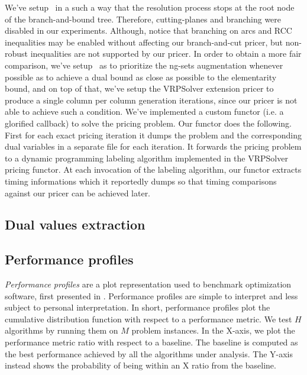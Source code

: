 \medskip

We've setup \bapcod\ in a such a way that the resolution process stops at the root
node of the branch-and-bound tree.
Therefore, cutting-planes and branching were disabled in our experiments.
Although, notice that branching on arcs and RCC inequalities may be
enabled without affecting our branch-and-cut pricer, but non-robust
inequalities are not supported by our pricer.
In order to obtain a more fair comparison, we've setup \bapcod\ as to prioritize
the ng-sets augmentation whenever possible as to achieve a dual bound as close
as possible to the elementarity bound, and on top of that,
we've setup the VRPSolver extension pricer to produce a single column
per column generation iterations, since our pricer is not able to achieve
such a condition.
We've implemented a custom functor (i.e. a glorified callback) to solve the pricing problem.
Our functor does the following.
First for each exact pricing iteration it dumps the problem and the corresponding dual variables
in a separate file for each iteration.
It forwards the pricing problem to a dynamic programming labeling algorithm
implemented in the VRPSolver pricing functor.
At each invocation of the labeling algorithm, our functor extracts timing informations
which it reportedly dumps so that timing comparisons against our pricer can be achieved later.

%
%
%

\subsection{Dual values extraction}


\subsection{Performance profiles}
\label{sec:results-performance-profiles}

\textit{Performance profiles} are a plot representation used to benchmark optimization software,
first presented in \textcite{dolan2002}.
Performance profiles are simple to interpret and less subject to personal interpretation.
In short, performance profiles plot the cumulative distribution function with respect to a performance metric.
We test $H$ algorithms by running them on $M$ problem instances.
In the X-axis, we plot the performance metric ratio with respect to a baseline.
The baseline is computed as the best performance achieved by all the algorithms under analysis.
The Y-axis instead shows the probability of being within an X ratio from the baseline.

